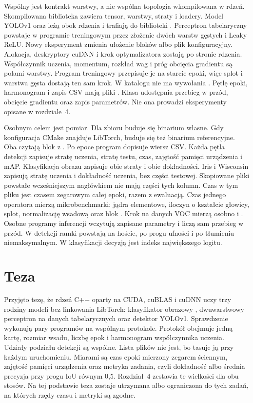 Wspólny jest kontrakt warstwy, a nie wspólna topologia wkompilowana w rdzeń. Skompilowana biblioteka  zawiera tensor, warstwy, straty i loadery. Model YOLOv1 oraz  leżą obok rdzenia i trafiają do biblioteki . Perceptron tabelaryczny powstaje w programie treningowym przez złożenie dwóch warstw gęstych i Leaky ReLU. Nowy eksperyment zmienia ułożenie bloków albo plik konfiguracyjny. Alokacja, deskryptory cuDNN i krok optymalizatora zostają po stronie rdzenia. Współczynnik uczenia, momentum, rozkład wag i próg obcięcia gradientu są polami warstwy. Program treningowy przepisuje je na starcie epoki, więc splot i warstwa gęsta dostają ten sam krok. W katalogu  nie ma wywołania . Pętlę epoki, harmonogram i zapis CSV mają pliki . Klasa  udostępnia przebieg w przód, obcięcie gradientu oraz zapis parametrów. Nie ona prowadzi eksperymenty opisane w rozdziale~4.

Osobnym celem jest pomiar. Dla zbioru buduje się binarium własne. Gdy konfiguracja CMake znajduje LibTorch, buduje się też binarium referencyjne. Oba czytają blok z . Po epoce program dopisuje wiersz CSV. Każda pętla detekcji zapisuje stratę uczenia, stratę testu, czas, zajętość pamięci urządzenia i mAP. Klasyfikacja obrazu zapisuje obie straty i obie dokładności. Iris i Wisconsin zapisują stratę uczenia i dokładność uczenia, bez części testowej. Skopiowane pliki powstałe wcześniejszym nagłówkiem nie mają części tych kolumn. Czas w tym pliku jest czasem zegarowym całej epoki, razem z ewaluacją. Czas jednego operatora mierzą mikrobenchmarki: jądra elementowe, iloczyn o kształcie głowicy, splot, normalizację wsadową oraz blok . Krok na danych VOC mierzą osobno  i . Osobne programy inferencji wczytują zapisane parametry i liczą sam przebieg w przód. W detekcji ramki powstają na hoście, po progu ufności i po tłumieniu niemaksymalnym. W klasyfikacji decyzją jest indeks największego logitu.

\section{Teza}

Przyjęto tezę, że rdzeń C++ oparty na CUDA, cuBLAS i cuDNN uczy trzy rodziny modeli bez linkowania LibTorch: klasyfikator obrazowy , dwuwarstwowy perceptron na danych tabelarycznych oraz detektor YOLOv1. Sprawdzenie wykonują pary programów na wspólnym protokole. Protokół obejmuje jedną kartę, rozmiar wsadu, liczbę epok i harmonogram współczynnika uczenia. Udziały podziału detekcji są wspólne. Lista plików nie jest, bo  tasuje ją przy każdym uruchomieniu. Miarami są czas epoki mierzony zegarem ściennym, zajętość pamięci urządzenia oraz metryka zadania, czyli dokładność albo średnia precyzja przy progu IoU równym 0,5. Rozdział~4 zestawia te wielkości dla obu stosów. Na tej podstawie teza zostaje utrzymana albo ograniczona do tych zadań, na których rzędy czasu i metryki są zgodne.

